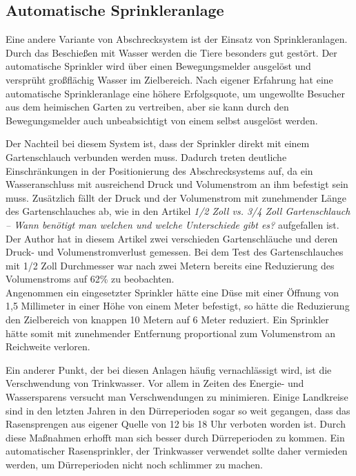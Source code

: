 \subsection{Automatische Sprinkleranlage} \label{sprinkler}

Eine andere Variante von Abschrecksystem ist der Einsatz von Sprinkleranlagen. Durch das Beschießen mit Wasser werden die Tiere besonders gut gestört. Der automatische Sprinkler wird über einen Bewegungsmelder ausgelöst und versprüht großflächig Wasser im Zielbereich. Nach eigener Erfahrung hat eine automatische Sprinkleranlage eine höhere Erfolgsquote, um ungewollte Besucher aus dem heimischen Garten zu vertreiben, aber sie kann durch den Bewegungsmelder auch unbeabsichtigt von einem selbst ausgelöst werden.\cite{anti_wasch}

Der Nachteil bei diesem System ist, dass der Sprinkler direkt mit einem Gartenschlauch verbunden werden muss. Dadurch treten deutliche Einschränkungen in der Positionierung des Abschrecksystems auf, da ein Wasseranschluss mit ausreichend Druck und Volumenstrom an ihm befestigt sein muss. Zusätzlich fällt der Druck und der Volumenstrom mit zunehmender Länge des Gartenschlauches ab, wie in den Artikel \textit{1/2 Zoll vs. 3/4 Zoll Gartenschlauch – Wann benötigt man welchen und welche Unterschiede gibt es?} aufgefallen ist. Der Author hat in diesem Artikel zwei verschieden Gartenschläuche und deren Druck- und Volumenstromverlust gemessen. Bei dem Test des Gartenschlauches mit 1/2 Zoll Durchmesser war nach zwei Metern bereits eine Reduzierung des Volumenstroms auf 62\% zu beobachten.\\

Angenommen ein eingesetzter Sprinkler hätte eine Düse mit einer Öffnung von 1,5 Millimeter in einer Höhe von einem Meter befestigt, so hätte die Reduzierung den Zielbereich von knappen 10 Metern auf 6 Meter reduziert.
Ein Sprinkler hätte somit mit zunehmender Entfernung proportional zum Volumenstrom an Reichweite verloren.

Ein anderer Punkt, der bei diesen Anlagen häufig vernachlässigt wird, ist die Verschwendung von Trinkwasser. Vor allem in Zeiten des Energie- und Wassersparens versucht man Verschwendungen zu minimieren. Einige Landkreise sind in den letzten Jahren in den Dürreperioden sogar so weit gegangen, dass das Rasensprengen aus eigener Quelle von 12 bis 18 Uhr verboten worden ist. Durch diese Maßnahmen erhofft man sich besser durch Dürreperioden zu kommen. Ein automatischer Rasensprinkler, der Trinkwasser verwendet sollte daher vermieden werden, um Dürreperioden nicht noch schlimmer zu machen.\cite{wasser_verbot}


